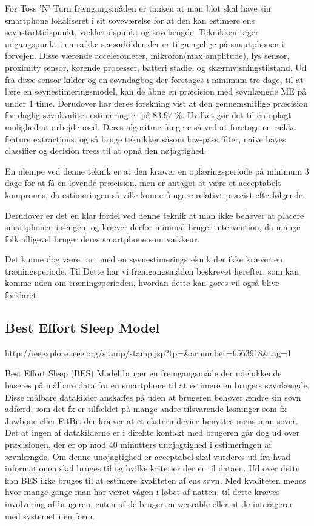 For Toss 'N' Turn fremgangsmåden er tanken at man blot skal have sin smartphone lokaliseret i sit soveværelse for at den kan estimere ens søvnstarttidspunkt, vækketidspunkt og sovelængde.
Teknikken tager udgangspunkt i en række sensorkilder der er tilgængelige på smartphonen i forvejen.
Disse værende accelerometer, mikrofon(max amplitude), lys sensor, proximity sensor, kørende processer, batteri stadie, og skærmvisningstilstand.
Ud fra disse sensor kilder og en søvndagbog der foretages i minimum tre dage, til at lære en søvnestimeringsmodel, kan de åbne en præcision med søvnlængde ME på under 1 time.
Derudover har deres forskning vist at den gennemsnitlige præcision for daglig søvnkvalitet estimering er på 83.97 \%. Hvilket gør det til en oplagt mulighed at arbejde med.
Deres algoritme fungere så ved at foretage en række feature extractions, og så bruge teknikker såsom low-pass filter, naive bayes classifier og decision trees til at opnå den nøjagtighed.

En ulempe ved denne teknik er at den kræver en oplæringsperiode på minimum 3 dage for at få en lovende præcision, men er antaget at være et acceptabelt kompromis, da estimeringen så ville kunne fungere relativt præcist efterfølgende.

Derudover er det en klar fordel ved denne teknik at man ikke behøver at placere smartphonen i sengen, og kræver derfor minimal bruger intervention, da mange folk alligevel bruger deres smartphone som vækkeur.

Det kunne dog være rart med en søvnestimeringsteknik der ikke kræver en træningsperiode.
Til Dette har vi fremgangsmåden beskrevet herefter, som kan komme uden om træningsperioden, hvordan dette kan gøres vil også blive forklaret. 

\subsection{Best Effort Sleep Model}
http://ieeexplore.ieee.org/stamp/stamp.jsp?tp=&arnumber=6563918&tag=1 

Best Effort Sleep (BES) Model bruger en fremgangsmåde der udelukkende baseres på målbare data fra en smartphone til at estimere en brugers søvnlængde.
Disse målbare datakilder anskaffes på uden at brugeren behøver ændre sin søvn adfærd, som det fx er tilfældet på mange andre tilsvarende løsninger som fx Jawbone eller FitBit der kræver at et ekstern device benyttes mens man sover.
Det at ingen af datakilderne er i direkte kontakt med brugeren går dog ud over præcisionen, der er op mod 40 minutters unøjagtighed i estimeringen af søvnlængde.
Om denne unøjagtighed er acceptabel skal vurderes ud fra hvad informationen skal bruges til og hvilke kriterier der er til dataen.
Ud over dette kan BES ikke bruges til at estimere kvaliteten af ens søvn.
Med kvaliteten menes hvor mange gange man har været vågen i løbet af natten, til dette kræves involvering af brugeren, enten af de bruger en wearable eller at de interagerer med systemet i en form.

